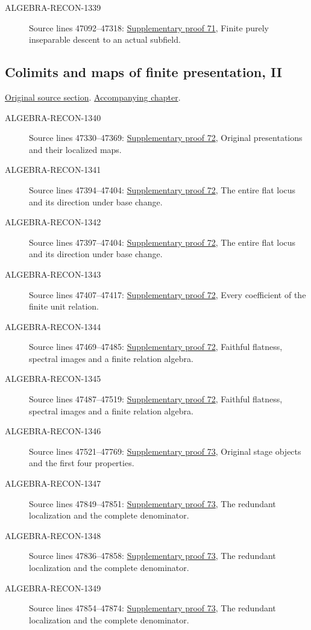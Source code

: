 \begin{description}
\item[ALGEBRA-RECON-1339] Source lines 47092--47318: \hyperlink{algebra_georeg_cm_notes_20260929}{Supplementary proof 71}, Finite purely inseparable descent to an actual subfield.
\end{description}

\subsection{Colimits and maps of finite presentation, II}
\hypertarget{algebra-source-section-colimits-finite-presentation}{}
\noindent\href{https://github.com/stacks/stacks-project/blob/a04446e57ec1fbc252a871afcec7752fb2807b14/algebra.tex\#L47319}{Original source section}. \href{algebra.pdf\#nameddest=section-colimits-finite-presentation}{Accompanying chapter}.

\begin{description}
\item[ALGEBRA-RECON-1340] Source lines 47330--47369: \hyperlink{algebra_fp_flat_notes_20260929}{Supplementary proof 72}, Original presentations and their localized maps.
\item[ALGEBRA-RECON-1341] Source lines 47394--47404: \hyperlink{algebra_fp_flat_notes_20260929}{Supplementary proof 72}, The entire flat locus and its direction under base change.
\item[ALGEBRA-RECON-1342] Source lines 47397--47404: \hyperlink{algebra_fp_flat_notes_20260929}{Supplementary proof 72}, The entire flat locus and its direction under base change.
\item[ALGEBRA-RECON-1343] Source lines 47407--47417: \hyperlink{algebra_fp_flat_notes_20260929}{Supplementary proof 72}, Every coefficient of the finite unit relation.
\item[ALGEBRA-RECON-1344] Source lines 47469--47485: \hyperlink{algebra_fp_flat_notes_20260929}{Supplementary proof 72}, Faithful flatness, spectral images and a finite relation algebra.
\item[ALGEBRA-RECON-1345] Source lines 47487--47519: \hyperlink{algebra_fp_flat_notes_20260929}{Supplementary proof 72}, Faithful flatness, spectral images and a finite relation algebra.
\item[ALGEBRA-RECON-1346] Source lines 47521--47769: \hyperlink{algebra_fp_end_notes_20260929}{Supplementary proof 73}, Original stage objects and the first four properties.
\item[ALGEBRA-RECON-1347] Source lines 47849--47851: \hyperlink{algebra_fp_end_notes_20260929}{Supplementary proof 73}, The redundant localization and the complete denominator.
\item[ALGEBRA-RECON-1348] Source lines 47836--47858: \hyperlink{algebra_fp_end_notes_20260929}{Supplementary proof 73}, The redundant localization and the complete denominator.
\item[ALGEBRA-RECON-1349] Source lines 47854--47874: \hyperlink{algebra_fp_end_notes_20260929}{Supplementary proof 73}, The redundant localization and the complete denominator.
\end{description}

